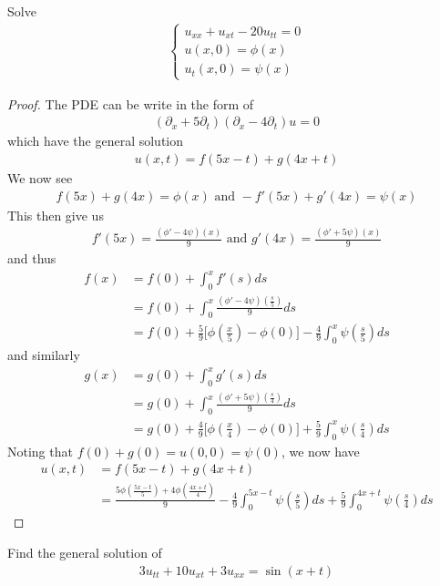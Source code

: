 \documentclass{report}
\begin{document}
\begin{question}{}{}
Solve 
\begin{align*}
\begin{cases}
u_{xx}+u_{xt}-20u_{tt}=0 \\
u(x,0)=\phi (x) \\
u_t(x,0)= \psi (x)
\end{cases}
\end{align*}
\end{question}
\begin{proof}
The PDE can be write in the form of 
\begin{align*}
  (\partial_x + 5\partial_t) (\partial_x - 4 \partial _t)u=0
\end{align*}
which have the general solution 
\begin{align*}
u(x,t)=f(5x-t)+g(4x+t)
\end{align*}
We now see 
\begin{align*}
f(5x)+g(4x)=\phi (x)\text{ and }-f'(5x)+g'(4x)=\psi (x)
\end{align*}
This then give us 
\begin{align*}
f'(5x)=\frac{(\phi' - 4\psi)(x)}{9}\text{ and }g'(4x)= \frac{(\phi '+5\psi )(x)}{9}
\end{align*}
and thus 
\begin{align*}
f(x)&=f(0)+ \int_0^x f'(s)ds\\
&=f(0)+\int_0^x \frac{(\phi' -4\psi)(\frac{s}{5})}{9}ds \\
&=f(0)+ \frac{5}{9}\Big[\phi (\frac{x}{5})-\phi (0) \Big] - \frac{4}{9}\int_0^x \psi (\frac{s}{5})ds
\end{align*}
and similarly 
\begin{align*}
g(x)&=g(0)+\int_0^x g'(s)ds \\
&=g(0)+ \int_0^x \frac{(\phi ' +5 \psi )(\frac{s}{4})}{9}ds \\
&=g(0)+ \frac{4}{9}\Big[ \phi (\frac{x}{4})- \phi (0) \Big]+\frac{5}{9} \int_0^x \psi (\frac{s}{4})ds
\end{align*}
Noting that $f(0)+g(0)=u(0,0)=\psi (0)$, we now have
\begin{align*}
u(x,t)&=f(5x-t)+g(4x+t) \\
&=\frac{5\phi (\frac{5x-t}{5})+4 \phi (\frac{4x+t}{4})}{9} - \frac{4}{9}\int_0^{5x-t}\psi (\frac{s}{5})ds + \frac{5}{9}\int_0^{4x+t}\psi (\frac{s}{4})ds
\end{align*}
\end{proof}
\begin{question}{}{}
Find the general solution of 
\begin{align*}
3u_{tt}+10u_{xt}+3u_{xx}=\sin (x+t)
\end{align*}
\end{question}
\end{document}
